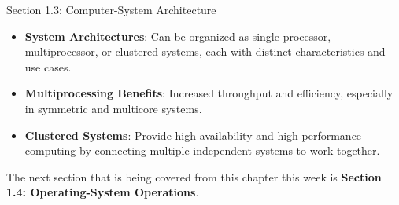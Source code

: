 \begin{notes}{Section 1.3: Computer-System Architecture}
\begin{highlight}
    \end{highlight}
    
    \begin{highlight}
    
    \begin{itemize}
        \item \textbf{System Architectures}: Can be organized as single-processor, multiprocessor, or clustered systems, each with distinct characteristics and use cases.
        \item \textbf{Multiprocessing Benefits}: Increased throughput and efficiency, especially in symmetric and multicore systems.
        \item \textbf{Clustered Systems}: Provide high availability and high-performance computing by connecting multiple independent systems to work together.
    \end{itemize}
    
    \end{highlight}
\end{notes}

The next section that is being covered from this chapter this week is \textbf{Section 1.4: Operating-System Operations}.

